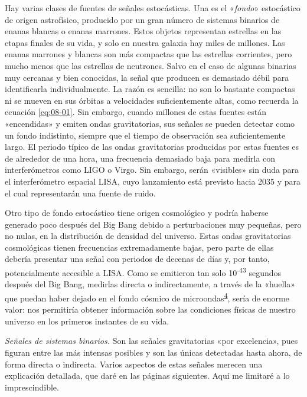 Hay varias clases de fuentes de señales estocásticas. Una es el «\emph{fondo}» estocástico de origen astrofísico, producido por un gran número de sistemas binarios de enanas blancas o enanas marrones. Estos objetos representan estrellas en las etapas finales de su vida, y solo en nuestra galaxia hay miles de millones. Las enanas marrones y blancas son más compactas que las estrellas corrientes, pero mucho menos que las estrellas de neutrones. Salvo en el caso de algunas binarias muy cercanas y bien conocidas, la señal que producen es demasiado débil para identificarla individualmente. La razón es sencilla: no son lo bastante compactas ni se mueven en sus órbitas a velocidades suficientemente altas, como recuerda la ecuación \eqref{eq:08-01}. Sin embargo, cuando millones de estas fuentes están «encendidas» y emiten ondas gravitatorias, sus señales se pueden detectar como un fondo indistinto, siempre que el tiempo de observación sea suficientemente largo. El periodo típico de las ondas gravitatorias producidas por estas fuentes es de alrededor de una hora, una frecuencia demasiado baja para medirla con interferómetros como LIGO o Virgo. Sin embargo, serán «visibles» sin duda para el interferómetro espacial LISA, cuyo lanzamiento está previsto hacia 2035 y para el cual representarán una fuente de ruido.

Otro tipo de fondo estocástico tiene origen cosmológico y podría haberse generado poco después del Big Bang debido a perturbaciones muy pequeñas, pero no nulas, en la distribución de densidad del universo. Estas ondas gravitatorias cosmológicas tienen frecuencias extremadamente bajas, pero parte de ellas debería presentar una señal con periodos de decenas de días y, por tanto, potencialmente accesible a LISA. Como se emitieron tan solo 10\textsuperscript{-43} segundos después del Big Bang, medirlas directa o indirectamente, a través de la «huella» que puedan haber dejado en el fondo cósmico de microondas\textsuperscript{\hyperlink{note:08-04}{4}}, sería de enorme valor: nos permitiría obtener información sobre las condiciones físicas de nuestro universo en los primeros instantes de su vida.

\emph{Señales de sistemas binarios.} Son las señales gravitatorias «por excelencia», pues figuran entre las más intensas posibles y son las únicas detectadas hasta ahora, de forma directa o indirecta. Varios aspectos de estas señales merecen una explicación detallada, que daré en las páginas siguientes. Aquí me limitaré a lo imprescindible.

